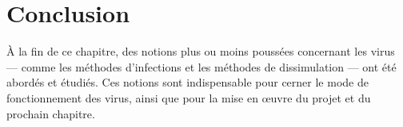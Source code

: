 \section{Conclusion}
À la fin de ce chapitre, des notions plus ou moins poussées concernant les virus --- comme les méthodes d'infections 
et les méthodes de dissimulation --- ont été abordés et étudiés. Ces notions sont indispensable pour cerner le 
mode de fonctionnement des virus, ainsi que pour la mise en œuvre du projet et du prochain chapitre.